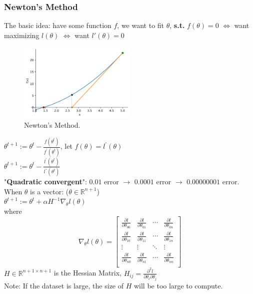 \documentclass{article}
\begin{document}
\subsubsection{Newton's Method}
The basic idea: have some function $f$, we want to fit $\theta$, \textbf{s.t.} $f(\theta)=0$ $\iff$ want maximizing $l(\theta)$ $\iff$ want $l'(\theta)=0$\\
\begin{figure}[H]
	\centerline{
   \includegraphics[width=0.5\textwidth]{Fig2.png}}
   \caption{Newton's Method.}
   \label{fig:example}
\end{figure}
\noindent
$\theta^{t+1} := \theta^{t} - \frac{f(\theta^t)}{f^{'}(\theta^t)}$, let $f(\theta) = l^{'}(\theta)$\\
$\theta^{t+1} := \theta^{t} - \frac{l^{'}(\theta^t)}{l^{''}(\theta^t)}$\\

\noindent
"\textbf{Quadratic convergent}": $0.01$ error $\longrightarrow$ $0.0001$ error $\longrightarrow$ $0.00000001$ error.\\

\noindent
When $\theta$ is a vector: ($\theta \in \mathbb{R}^{n+1}$)\\
\indent
$\theta^{t+1} := \theta^t + \alpha H^{-1}\nabla_\theta l(\theta)$\\
where 
$$
\nabla_\theta l(\theta) = 
\begin{bmatrix}
  \frac{\partial l}{\partial\theta_{00}} & \frac{\partial l}{\partial\theta_{01}} & \cdots & \frac{\partial l}{\partial\theta_{0n}} \\
  \frac{\partial l}{\partial\theta_{10}} & \frac{\partial l}{\partial\theta_{11}} & \cdots & \frac{\partial l}{\partial\theta_{1n}} \\
  \vdots & \vdots  & \ddots & \vdots \\
  \frac{\partial l}{\partial\theta_{n0}} & \frac{\partial l}{\partial\theta_{n1}} & \cdots & \frac{\partial l}{\partial\theta_{nn}} \\
\end{bmatrix}
$$
$H \in \mathbb{R}^{n+1 \times n+1}$ is the Hessian Matrix, $H_{ij} = \frac{\partial^2l}{\partial\theta_i\partial\theta_j}$\\
Note: If the dataset is large, the size of $H$ will be too large to compute.
\indent
\end{document}

